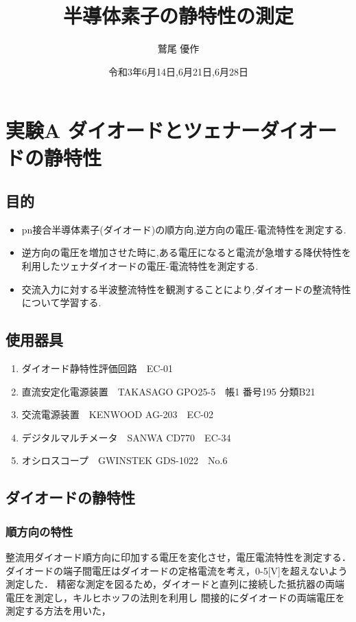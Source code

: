 \documentclass[titlepage]{jarticle}
\title{半導体素子の静特性の測定}
\author{鷲尾 優作}
\date{令和3年6月14日,6月21日,6月28日}
\begin{document}
\maketitle

\tableofcontents
\newpage

\section{実験A ダイオードとツェナーダイオードの静特性}
\subsection{目的}
\begin{itemize}
    \item pn接合半導体素子(ダイオード)の順方向,逆方向の電圧-電流特性を測定する.
    \item 逆方向の電圧を増加させた時に,ある電圧になると電流が急増する降伏特性を利用したツェナダイオードの電圧-電流特性を測定する.
    \item 交流入力に対する半波整流特性を観測することにより,ダイオードの整流特性について学習する.
\end{itemize}
\subsection{使用器具}
\begin{enumerate}
    \item ダイオード静特性評価回路　EC-01
    \item 直流安定化電源装置　TAKASAGO GPO25-5　帳1 番号195 分類B21
    \item 交流電源装置　KENWOOD AG-203　EC-02
    \item デジタルマルチメータ　SANWA CD770　EC-34
    \item オシロスコープ　GWINSTEK GDS-1022　No.6
\end{enumerate}
\subsection{ダイオードの静特性}

\subsubsection{順方向の特性}
整流用ダイオード順方向に印加する電圧を変化させ，電圧電流特性を測定する．
ダイオードの端子間電圧はダイオードの定格電流を考え，0-5[V]を超えないよう測定した．
精密な測定を図るため，ダイオードと直列に接続した抵抗器の両端電圧を測定し，キルヒホッフの法則を利用し
間接的にダイオードの両端電圧を測定する方法を用いた，
\end{document}
